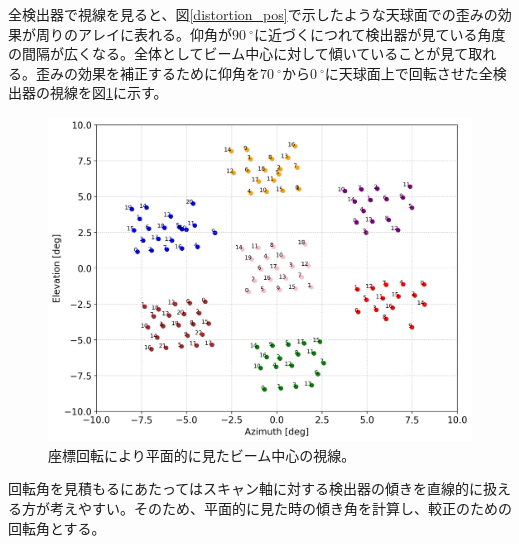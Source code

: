全検出器で視線を見ると、図\ref{distortion_pos}で示したような天球面での歪みの効果が周りのアレイに表れる。仰角が$\SI{90}{^{\circ}}$に近づくにつれて検出器が見ている角度の間隔が広くなる。全体としてビーム中心に対して傾いていることが見て取れる。歪みの効果を補正するために仰角を$\SI{70}{^{\circ}}$から$\SI{0}{^{\circ}}$に天球面上で回転させた全検出器の視線を図\ref{before_full_pos_0}に示す。
\begin{figure}[htbp]
  \centering
  \includegraphics[width=1.0\columnwidth]{5_alignment/figs/before_full_pos.png}
  \caption{座標回転により平面的に見たビーム中心の視線。}
  \label{before_full_pos_0}
\end{figure}
回転角を見積もるにあたってはスキャン軸に対する検出器の傾きを直線的に扱える方が考えやすい。そのため、平面的に見た時の傾き角を計算し、較正のための回転角とする。

